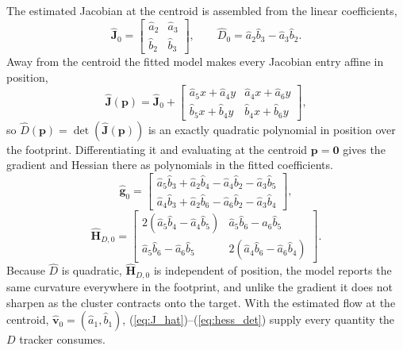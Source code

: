 \documentclass[lettersize,journal]{IEEEtran}
\begin{document}
The estimated Jacobian at the centroid is assembled from the linear
coefficients,
\begin{equation}
    \hat{\mathbf{J}}_0 =
    \begin{bmatrix}
        \hat{a}_2 & \hat{a}_3 \\ \hat{b}_2 & \hat{b}_3
    \end{bmatrix},
    \qquad
    \hat{D}_0 = \hat{a}_2 \hat{b}_3 - \hat{a}_3 \hat{b}_2.
    \label{eq:J_hat}
\end{equation}
Away from the centroid the fitted model makes every Jacobian entry affine
in position,
\begin{equation}
    \hat{\mathbf{J}}(\mathbf{p}) = \hat{\mathbf{J}}_0 +
    \begin{bmatrix}
        \hat{a}_5 x + \hat{a}_4 y &
        \hat{a}_4 x + \hat{a}_6 y \\
        \hat{b}_5 x + \hat{b}_4 y &
        \hat{b}_4 x + \hat{b}_6 y
    \end{bmatrix},
    \label{eq:jac_affine}
\end{equation}
so $\hat{D}(\mathbf{p}) = \det(\hat{\mathbf{J}}(\mathbf{p}))$ is an exactly
quadratic polynomial in position over the footprint. Differentiating
it and evaluating at the centroid $\mathbf{p} = \mathbf{0}$ gives the
gradient and Hessian there as polynomials in the fitted coefficients.
\begin{equation}
    \hat{\mathbf{g}}_0 =
    \begin{bmatrix}
        \hat{a}_5 \hat{b}_3 + \hat{a}_2 \hat{b}_4
            - \hat{a}_4 \hat{b}_2 - \hat{a}_3 \hat{b}_5 \\
        \hat{a}_4 \hat{b}_3 + \hat{a}_2 \hat{b}_6
            - \hat{a}_6 \hat{b}_2 - \hat{a}_3 \hat{b}_4
    \end{bmatrix},
    \label{eq:grad_det}
\end{equation}
\begin{equation}
    \hat{\mathbf{H}}_{D,0} =
    \begin{bmatrix}
        2(\hat{a}_5 \hat{b}_4 - \hat{a}_4 \hat{b}_5) &
        \hat{a}_5 \hat{b}_6 - \hat{a}_6 \hat{b}_5 \\
        \hat{a}_5 \hat{b}_6 - \hat{a}_6 \hat{b}_5 &
        2(\hat{a}_4 \hat{b}_6 - \hat{a}_6 \hat{b}_4)
    \end{bmatrix}.
    \label{eq:hess_det}
\end{equation}
Because $\hat{D}$ is quadratic, $\hat{\mathbf{H}}_{D,0}$ is independent of
position, the model reports the same curvature everywhere in the
footprint, and unlike the gradient it does not sharpen as the cluster
contracts onto the target. With the estimated flow at the centroid,
$\hat{\mathbf{v}}_0 = (\hat{a}_1, \hat{b}_1)$,
(\ref{eq:J_hat})--(\ref{eq:hess_det}) supply every quantity the $D$
tracker consumes.
\end{document}
